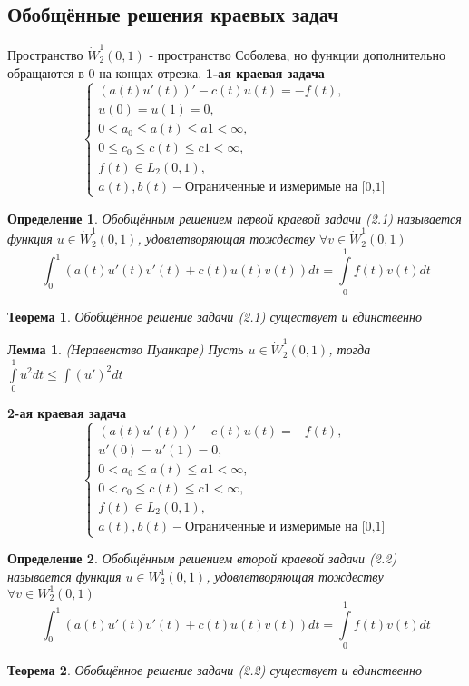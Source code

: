 \documentclass[9pt, a4paper]{extarticle}
\newtheorem{theorem}{Теорема}
\newtheorem{lemma}{Лемма}
\newtheorem{definition}{Определение}
\numberwithin{equation}{section}
\numberwithin{lemma}{section}
\numberwithin{definition}{section}
\numberwithin{notabene}{section}
\numberwithin{corollary}{section}
\begin{document}
	\subsection{Обобщённые решения краевых задач}
	Пространство $\dot{W}_2^1(0,1) $ - пространство Соболева, но функции дополнительно обращаются в 0 на концах отрезка.\newline 
	\textbf{1-ая краевая задача}
	\begin{equation}
		\begin{cases}
			\left(a(t) u'(t)\right)' - c(t) u(t) = - f(t), \\
			u(0) = u(1) = 0, \\
			0 < a_0 \leq a(t) \leq a1 < \infty, \\
			0 \leq c_0 \leq c(t) \leq c1 < \infty, \\
			f(t) \in L_2(0,1), \\
			a(t), b(t) - \text{Ограниченные и измеримые на [0,1]}
		\end{cases}		
	\end{equation}
	\begin{definition}
		Обобщённым решением первой краевой задачи (2.1) называется функция $u \in \dot{W}_2^1(0,1)$, удовлетворяющая тождеству $\forall v \in \dot{W}_2^1(0,1)$
		$$
			\int_0^1 \left(a(t) u'(t) v'(t) + c(t) u(t) v(t) \right) dt = \int\limits_0^1 f(t)v(t)dt
		$$
	\end{definition}
	\begin{theorem}
		Обобщённое решение задачи (2.1) существует и единственно
	\end{theorem}
	\begin{lemma}
		(Неравенство Пуанкаре)\newline
		Пусть $u \in \dot{W}_2^1(0,1)$, тогда $\int\limits_0^1 u^2 dt \leq \int\limits (u')^2 dt$
	\end{lemma}
	\textbf{2-ая краевая задача}
	\begin{equation}
		\begin{cases}
			\left(a(t) u'(t)\right)' - c(t) u(t) = - f(t), \\
			u'(0) = u'(1) = 0, \\
			0 < a_0 \leq a(t) \leq a1 < \infty, \\
			0 < c_0 \leq c(t) \leq c1 < \infty, \\
			f(t) \in L_2(0,1), \\
			a(t), b(t) - \text{Ограниченные и измеримые на [0,1]}
		\end{cases}		
	\end{equation}
	\begin{definition}
		Обобщённым решением второй краевой задачи (2.2) называется функция $u \in W_2^1(0,1)$, удовлетворяющая тождеству $\forall v \in W_2^1(0,1)$
		$$
		\int_0^1 \left(a(t) u'(t) v'(t) + c(t) u(t) v(t) \right) dt = \int\limits_0^1 f(t)v(t)dt
		$$
	\end{definition}
\begin{theorem}
	Обобщённое решение задачи (2.2) существует и единственно
\end{theorem}
\end{document}
